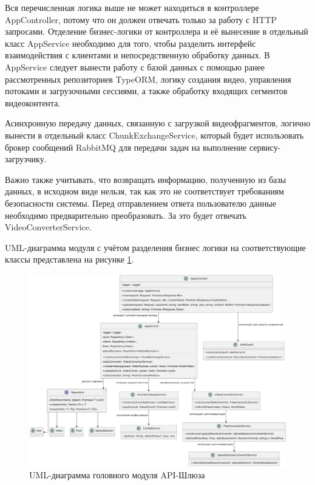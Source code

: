	Вся перечисленная логика выше не может находиться в контроллере AppController, потому что он должен отвечать только за работу с HTTP запросами. Отделение бизнес-логики от контроллера и её вынесение в отдельный класс AppService необходимо для того, чтобы разделить интерфейс взаимодействия с клиентами и непосредственную обработку данных. В AppService следует вынести работу с базой данных с помощью ранее рассмотренных репозиториев TypeORM, логику создания видео, управления потоками и загрузочными сессиями, а также обработку входящих сегментов видеоконтента.
	
	Асинхронную передачу данных, связанную с загрузкой видеофрагментов, логично вынести в отдельный класс ChunkExchangeService, который будет использовать брокер сообщений RabbitMQ для передачи задач на выполнение сервису-загрузчику.
	
	Важно также учитывать, что возвращать информацию, полученную из базы данных, в исходном виде нельзя, так как это не соответствует требованиям безопасности системы. Перед отправлением ответа пользователю данные необходимо предварительно преобразовать. За это будет отвечать VideoConverterService.
	
	UML-диаграмма модуля с учётом разделения бизнес логики на соответствующие классы представлена на рисунке \ref{fig:uml_gateway_main}.

	\begin{figure}[ht!] 
		\center
		\includegraphics [scale=0.2] {my_folder/images//uml_gateway_main}
		\caption{UML-диаграмма головного модуля API-Шлюза} 
		\label{fig:uml_gateway_main}  
	\end{figure}

